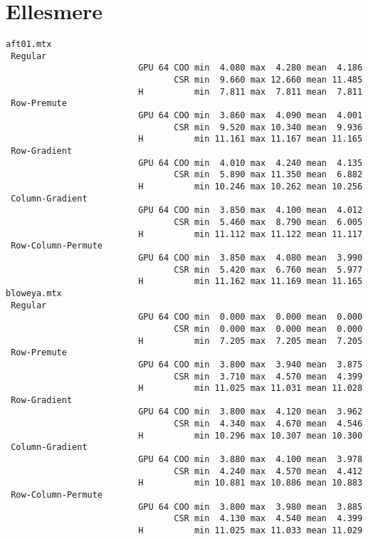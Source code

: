 \section{Ellesmere}
\label{sec:ellesmere}
{\tiny

\begin{verbatim}
aft01.mtx
 Regular
                          GPU 64 COO min  4.080 max  4.280 mean  4.186
                                 CSR min  9.660 max 12.660 mean 11.485
                          H          min  7.811 max  7.811 mean  7.811
 Row-Premute
                          GPU 64 COO min  3.860 max  4.090 mean  4.001
                                 CSR min  9.520 max 10.340 mean  9.936
                          H          min 11.161 max 11.167 mean 11.165
 Row-Gradient
                          GPU 64 COO min  4.010 max  4.240 mean  4.135
                                 CSR min  5.890 max 11.350 mean  6.882
                          H          min 10.246 max 10.262 mean 10.256
 Column-Gradient
                          GPU 64 COO min  3.850 max  4.100 mean  4.012
                                 CSR min  5.460 max  8.790 mean  6.005
                          H          min 11.112 max 11.122 mean 11.117
 Row-Column-Permute
                          GPU 64 COO min  3.850 max  4.080 mean  3.990
                                 CSR min  5.420 max  6.760 mean  5.977
                          H          min 11.162 max 11.169 mean 11.165
bloweya.mtx
 Regular
                          GPU 64 COO min  0.000 max  0.000 mean  0.000
                                 CSR min  0.000 max  0.000 mean  0.000
                          H          min  7.205 max  7.205 mean  7.205
 Row-Premute
                          GPU 64 COO min  3.800 max  3.940 mean  3.875
                                 CSR min  3.710 max  4.570 mean  4.399
                          H          min 11.025 max 11.031 mean 11.028
 Row-Gradient
                          GPU 64 COO min  3.800 max  4.120 mean  3.962
                                 CSR min  4.340 max  4.670 mean  4.546
                          H          min 10.296 max 10.307 mean 10.300
 Column-Gradient
                          GPU 64 COO min  3.880 max  4.100 mean  3.978
                                 CSR min  4.240 max  4.570 mean  4.412
                          H          min 10.881 max 10.886 mean 10.883
 Row-Column-Permute
                          GPU 64 COO min  3.800 max  3.980 mean  3.885
                                 CSR min  4.130 max  4.540 mean  4.399
                          H          min 11.025 max 11.033 mean 11.029

\end{verbatim}}
